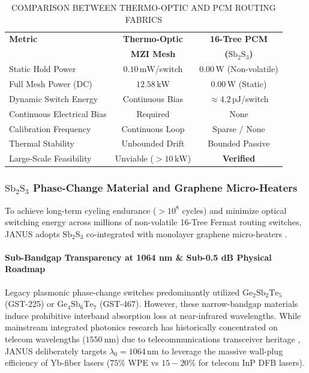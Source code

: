 \documentclass[journal]{IEEEtran}
\begin{document}
\begin{table}[htbp]
\centering
\footnotesize
\renewcommand{\arraystretch}{1.15}
\caption{COMPARISON BETWEEN THERMO-OPTIC AND PCM ROUTING FABRICS}
\label{tab:table4}
\begin{tabularx}{\columnwidth}{@{}Xcc@{}}
\toprule
\textbf{Metric} & \textbf{Thermo-Optic} & \textbf{16-Tree PCM} \\
 & \textbf{MZI Mesh} & \textbf{($\mathrm{Sb_2S_3}$)} \\
\midrule
Static Hold Power & $0.10\,\mathrm{mW}$/switch & $\mathbf{0.00\,\mathrm{W}}$ (Non-volatile) \\
Full Mesh Power (DC) & $12.58\,\mathrm{kW}$ & $\mathbf{0.00\,\mathrm{W}}$ (Static) \\
Dynamic Switch Energy & Continuous Bias & $\approx 4.2\,\mathrm{pJ}$/switch \\
Continuous Electrical Bias & Required & None \\
Calibration Frequency & Continuous Loop & Sparse / None \\
Thermal Stability & Unbounded Drift & Bounded Passive \\
Large-Scale Feasibility & Unviable ($>10\,\mathrm{kW}$) & \textbf{Verified} \\
\bottomrule
\end{tabularx}
\end{table}

\subsubsection{\textbf{$\mathrm{Sb_2S_3}$ Phase-Change Material and Graphene Micro-Heaters}}

To achieve long-term cycling endurance ($> 10^8$ cycles) and minimize optical switching energy across millions of non-volatile 16-Tree Fermat routing switches, JANUS adopts $\mathrm{Sb_2S_3}$ co-integrated with monolayer graphene micro-heaters \cite{Rios2021}.

\paragraph{\textbf{Sub-Bandgap Transparency at 1064 nm \& Sub-0.5 dB Physical Roadmap}}
Legacy plasmonic phase-change switches predominantly utilized $\mathrm{Ge_2Sb_2Te_5}$ (GST-225) or $\mathrm{Ge_4Sb_6Te_7}$ (GST-467). However, these narrow-bandgap materials induce prohibitive interband absorption loss at near-infrared wavelengths. While mainstream integrated photonics research has historically concentrated on telecom wavelengths ($1550~\mathrm{nm}$) due to telecommunications transceiver heritage \cite{Zhou2024,Bao2025}, JANUS deliberately targets $\lambda_0 = 1064\,\mathrm{nm}$ to leverage the massive wall-plug efficiency of Yb-fiber lasers ($75\%$ WPE vs $15-20\%$ for telecom InP DFB lasers).
\end{document}
